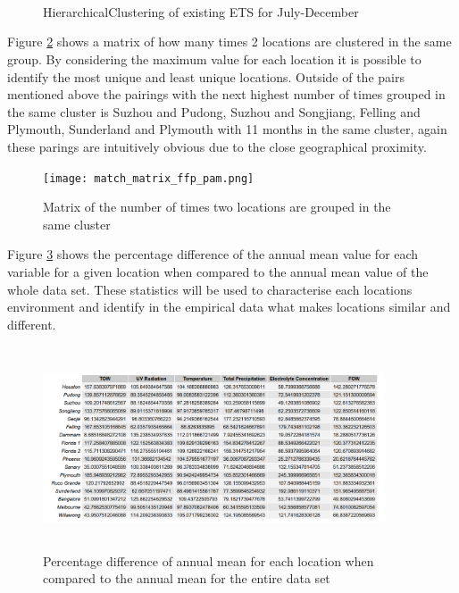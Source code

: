\documentclass{article}
\begin{document}
\begin{figure}[H]
\centering
{}\hfill
{}\\
\hfill
{}\\
\hfill
{}\\
\caption{HierarchicalClustering of existing ETS for July-December}
\label{fig:jul_dec_ffp_dend}
\end{figure}


Figure \ref{fig:match_matrix_ffp_pam} shows a matrix of how many times 2 locations are clustered in the same group. By considering the maximum value for each location it is possible to identify the most unique and least unique locations. Outside of the pairs mentioned above the pairings with the next highest number of times grouped in the same cluster is Suzhou and Pudong,  Suzhou and Songjiang, Felling and Plymouth, Sunderland and Plymouth with 11 months in the same cluster, again these parings are intuitively obvious due to the close geographical proximity. 

\begin{figure}[H]
\centering
\texttt{[image: match\_matrix\_ffp\_pam.png]}
\caption{Matrix of the number of times two locations are grouped in the same cluster}
\label{fig:match_matrix_ffp_pam}
\end{figure}




Figure \ref{fig:var_means_ffp} shows the percentage difference of the annual mean value for each variable for a given location when compared to the annual mean value of the whole data set. These statistics will be used to characterise each locations environment and identify in the empirical data what makes locations similar and different. 

\begin{figure}[H]
\centering
\includegraphics[width=0.9\textwidth, height= 6cm]{variable_means_ffp.png}
\caption{Percentage difference of annual mean for each location when compared to the annual mean for the entire data set}
\label{fig:var_means_ffp}
\end{figure}
\end{document}
